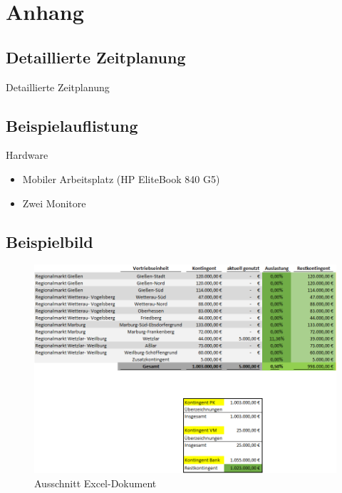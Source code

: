 

\section{Anhang}
    \subsection{Detaillierte Zeitplanung}
    \label{app:Zeitplanung}
    \begin{table}[ht]
        \caption{Detaillierte Zeitplanung}
    \end{table}
    
    \subsection{Beispielauflistung}
    \label{app:Beispielauflistung}
    Hardware
    \begin{itemize}
        \item Mobiler Arbeitsplatz (HP EliteBook 840 G5)
        \item 	Zwei Monitore
    \end{itemize}
    
    
    \subsection{Beispielbild}
    \label{app:Excel}

    \begin{figure}[H]
        \includegraphics[width=\textwidth,height=\textheight,keepaspectratio]{images/img_exceltable.png}
        \caption{Ausschnitt Excel-Dokument}
    \end{figure}

